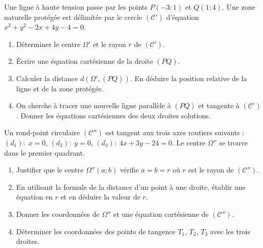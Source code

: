 \documentclass[11pt]{article}
\begin{document}
\begin{exercice}
Une ligne à haute tension passe par les points $P(-3; 1)$ et $Q(1; 4)$. 
Une zone naturelle protégée est délimitée par le cercle $(\mathcal{C}')$ d'équation $x^2 + y^2 - 2x + 4y - 4 = 0$.
\begin{enumerate}
    \item Déterminer le centre $\Omega'$ et le rayon $r$ de $(\mathcal{C}')$.
    \item Écrire une équation cartésienne de la droite $(PQ)$.
    \item Calculer la distance $d(\Omega', (PQ))$. En déduire la position relative de la ligne et de la zone protégée.
    \item On cherche à tracer une nouvelle ligne parallèle à $(PQ)$ et tangente à $(\mathcal{C}')$. 
    Donner les équations cartésiennes des deux droites solutions.
\end{enumerate}
\end{exercice}

\begin{exercice}
Un rond-point circulaire $(\mathcal{C}'')$ est tangent aux trois axes routiers suivants :
$(d_1)\!:\; x = 0$, \quad $(d_2)\!:\; y = 0$, \quad $(d_3)\!:\; 4x + 3y - 24 = 0$.
Le centre $\Omega''$ se trouve dans le premier quadrant.
\begin{enumerate}
    \item Justifier que le centre $\Omega''(a; b)$ vérifie $a = b = r$ où $r$ est le rayon de $(\mathcal{C}'')$.
    \item En utilisant la formule de la distance d'un point à une droite, établir une équation en $r$ et en déduire la valeur de $r$.
    \item Donner les coordonnées de $\Omega''$ et une équation cartésienne de $(\mathcal{C}'')$.
    \item Déterminer les coordonnées des points de tangence $T_1$, $T_2$, $T_3$ avec les trois droites.
\end{enumerate}
\end{exercice}
\end{document}
